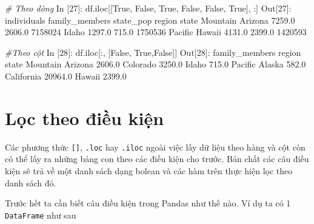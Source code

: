 \documentclass[
]{book}
\newenvironment{Shaded}{\begin{snugshade}}{\end{snugshade}}
\newcommand{\CommentTok}[1]{\textcolor[rgb]{0.56,0.35,0.01}{\textit{#1}}}
\newcommand{\DecValTok}[1]{\textcolor[rgb]{0.00,0.00,0.81}{#1}}
\newcommand{\FloatTok}[1]{\textcolor[rgb]{0.00,0.00,0.81}{#1}}
\newcommand{\NormalTok}[1]{#1}
\newcommand{\VariableTok}[1]{\textcolor[rgb]{0.00,0.00,0.00}{#1}}
\begin{document}
\begin{Shaded}
\begin{Highlighting}[]
\CommentTok{\# Theo dòng}
\NormalTok{In [}\DecValTok{27}\NormalTok{]: df.iloc[[}\VariableTok{True}\NormalTok{, }\VariableTok{False}\NormalTok{, }\VariableTok{True}\NormalTok{, }\VariableTok{False}\NormalTok{, }\VariableTok{False}\NormalTok{, }\VariableTok{True}\NormalTok{], :]}
\NormalTok{Out[}\DecValTok{27}\NormalTok{]:}
\NormalTok{                  individuals  family\_members  state\_pop}
\NormalTok{region   state                                          }
\NormalTok{Mountain Arizona       }\FloatTok{7259.0}          \FloatTok{2606.0}    \DecValTok{7158024}
\NormalTok{         Idaho         }\FloatTok{1297.0}           \FloatTok{715.0}    \DecValTok{1750536}
\NormalTok{Pacific  Hawaii        }\FloatTok{4131.0}          \FloatTok{2399.0}    \DecValTok{1420593}

\CommentTok{\#Theo cột}
\NormalTok{In [}\DecValTok{28}\NormalTok{]: df.iloc[:, [}\VariableTok{False}\NormalTok{, }\VariableTok{True}\NormalTok{,}\VariableTok{False}\NormalTok{]]}
\NormalTok{Out[}\DecValTok{28}\NormalTok{]: }
\NormalTok{                     family\_members}
\NormalTok{region   state                     }
\NormalTok{Mountain Arizona             }\FloatTok{2606.0}
\NormalTok{         Colorado            }\FloatTok{3250.0}
\NormalTok{         Idaho                }\FloatTok{715.0}
\NormalTok{Pacific  Alaska               }\FloatTok{582.0}
\NormalTok{         California         }\FloatTok{20964.0}
\NormalTok{         Hawaii              }\FloatTok{2399.0}
\end{Highlighting}
\end{Shaded}

\section{Lọc theo điều kiện}\label{lux1ecdc-theo-ux111iux1ec1u-kiux1ec7n}

Các phương thức \texttt{{[}{]}}, \texttt{.loc} hay \texttt{.iloc} ngoài việc lấy dữ liệu theo hàng và cột còn có thể lấy ra những bảng con theo các điều kiện cho trước. Bản chất các câu điều kiện sẽ trả về một danh sách dạng bolean và các hàm trên thực hiện lọc theo danh sách đó.

Trước hết ta cần biết câu điều kiện trong Pandas như thế nào. Ví dụ ta có 1 \texttt{DataFrame} như sau
\end{document}
